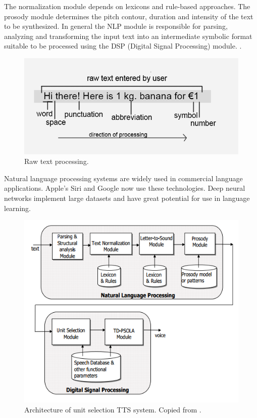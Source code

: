 \documentclass[11pt,a4paper,oneside,article]{memoir}
\begin{document}
The normalization module depends on lexicons and rule-based approaches. The prosody module determines the pitch contour, duration and intensity of the text to be synthesized. In general the NLP module is responsible for parsing, analyzing and transforming the input text into an intermediate symbolic format suitable to be processed using the DSP (Digital Signal Processing) module. \cite{chala}.

\begin{figure}[h]
  \includegraphics[width=12cm]{rawtext}
  \caption{Raw text processing.}
  \label{fig:rawtext}
\end{figure}

Natural language processing systems are widely used in commercial language applications. Apple's Siri and Google now use these technologies. Deep neural networks implement large datasets and have great potential for use in language learning. \cite{markowitz}

\begin{figure}[h]
  \includegraphics[width=12cm]{nlp}
  \caption{Architecture of unit selection TTS system. Copied from \cite{chala}.}
  \label{fig:nlp}
\end{figure}
\end{document}
